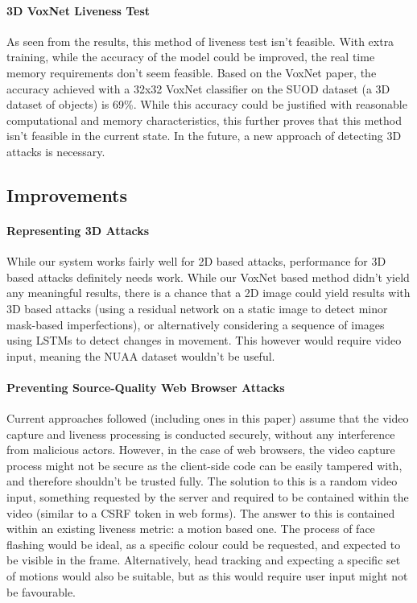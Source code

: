 \documentclass[11pt,a4paper]{article}
\begin{document}
        \paragraph{3D VoxNet Liveness Test}
            As seen from the results, this method of liveness test isn't feasible. With extra training, while the accuracy of the model could be improved, the
            real time memory requirements don't seem feasible. Based on the VoxNet paper, the accuracy achieved with a 32x32 VoxNet classifier on the SUOD dataset (a 3D dataset of objects)
            is 69\%. While this accuracy could be justified with reasonable computational and memory characteristics, this further proves that this method isn't feasible in the current state. In the future, a new approach of detecting 3D attacks is necessary.
    \subsection{Improvements}
        \paragraph{Representing 3D Attacks}
        While our system works fairly well for 2D based attacks, performance for 3D based attacks definitely needs work.
        While our VoxNet based method didn't yield any meaningful results, there is a chance that a 2D image could yield results
        with 3D based attacks (using a residual network on a static image to detect minor mask-based imperfections), or alternatively
        considering a sequence of images using LSTMs to detect changes in movement. This however would require video input, meaning the
        NUAA dataset wouldn't be useful.

        \paragraph{Preventing Source-Quality Web Browser Attacks}
        Current approaches followed (including ones in this paper) assume that the video capture and liveness processing is conducted securely, 
        without any interference from malicious actors. However, in the case of web browsers, the video capture process might not be secure as
        the client-side code can be easily tampered with, and therefore shouldn't be trusted fully. The solution to this is a random video input,
        something requested by the server and required to be contained within the video (similar to a CSRF token in web forms). The answer to this
        is contained within an existing liveness metric: a motion based one. The process of face flashing would be ideal, as a specific colour could
        be requested, and expected to be visible in the frame. Alternatively, head tracking and expecting a specific set of motions would also be suitable,
        but as this would require user input might not be favourable.
\end{document}
